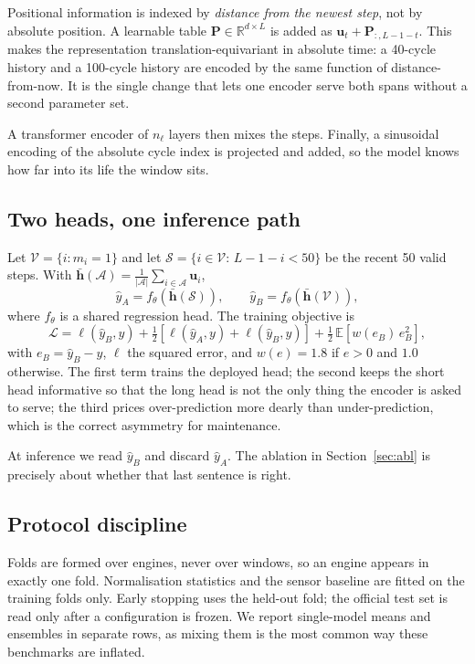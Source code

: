 \documentclass[journal,10pt]{IEEEtran}
\begin{document}
Positional information is indexed by \emph{distance from the newest step}, not by
absolute position. A learnable table $\mathbf{P}\in\mathbb{R}^{d\times L}$ is
added as $\mathbf{u}_t+\mathbf{P}_{:,L-1-t}$. This makes the representation
translation-equivariant in absolute time: a 40-cycle history and a 100-cycle
history are encoded by the same function of distance-from-now. It is the single
change that lets one encoder serve both spans without a second parameter set.

A transformer encoder of $n_\ell$ layers then mixes the steps. Finally, a
sinusoidal encoding of the absolute cycle index is projected and added, so the
model knows how far into its life the window sits.

\subsection{Two heads, one inference path}
Let $\mathcal{V}=\{i:m_i=1\}$ and let
$\mathcal{S}=\{i\in\mathcal{V}:\,L-1-i<50\}$ be the recent 50 valid steps. With
$\bar{\mathbf{h}}(\mathcal{A})=\frac{1}{|\mathcal{A}|}\sum_{i\in\mathcal{A}}\mathbf{u}_i$,
\begin{equation}
\hat y_A = f_\theta\!\left(\bar{\mathbf{h}}(\mathcal{S})\right),
\qquad
\hat y_B = f_\theta\!\left(\bar{\mathbf{h}}(\mathcal{V})\right),
\end{equation}
where $f_\theta$ is a shared regression head. The training objective is
\begin{equation}
\mathcal{L}
= \ell(\hat y_B, y)
+ \tfrac12\!\left[\ell(\hat y_A,y)+\ell(\hat y_B,y)\right]
+ \tfrac12\,\mathbb{E}\!\left[w(e_B)\,e_B^{2}\right],
\label{eq:loss}
\end{equation}
with $e_B=\hat y_B-y$, $\ell$ the squared error, and $w(e)=1.8$ if $e>0$ and
$1.0$ otherwise. The first term trains the deployed head; the second keeps the
short head informative so that the long head is not the only thing the encoder is
asked to serve; the third prices over-prediction more dearly than
under-prediction, which is the correct asymmetry for maintenance.

At inference we read $\hat y_B$ and discard $\hat y_A$. The ablation in
Section~\ref{sec:abl} is precisely about whether that last sentence is right.

\subsection{Protocol discipline}
Folds are formed over engines, never over windows, so an engine appears in exactly
one fold. Normalisation statistics and the sensor baseline are fitted on the
training folds only. Early stopping uses the held-out fold; the official test set
is read only after a configuration is frozen. We report single-model means and
ensembles in separate rows, as mixing them is the most common way these benchmarks
are inflated.
\end{document}
